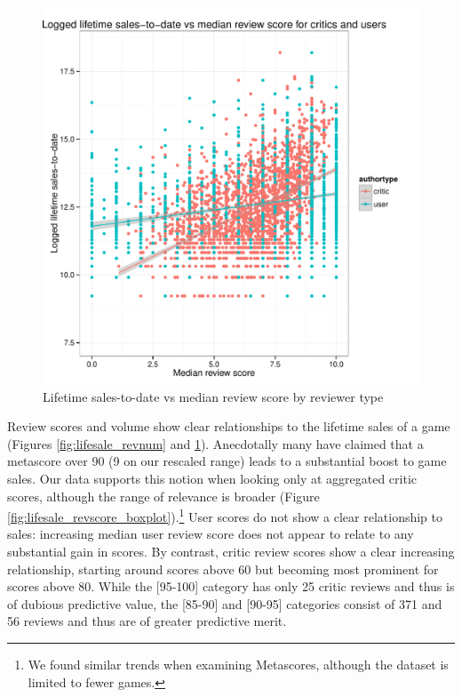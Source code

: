 \documentclass[letterpaper]{article}
\begin{document}
\begin{figure}[tbp]
\centering
\includegraphics[width=\linewidth]{./sales_medianscore_total}
\caption{Lifetime sales-to-date vs median review score by reviewer type}
\label{fig:lifesale_revscore}
\end{figure}

Review scores and volume show clear relationships to the lifetime sales of a game (Figures \ref{fig:lifesale_revnum} and \ref{fig:lifesale_revscore}). Anecdotally many have claimed that a metascore over 90 (9 on our rescaled range) leads to a substantial boost to game sales. Our data supports this notion when looking only at aggregated critic scores, although the range of relevance is broader (Figure \ref{fig:lifesale_revscore_boxplot}).\footnote{We found similar trends when examining Metascores, although the dataset is limited to fewer games.} User scores do not show a clear relationship to sales: increasing median user review score does not appear to relate to any substantial gain in scores. By contrast, critic review scores show a clear increasing relationship, starting around scores above 60 but becoming most prominent for scores above 80. While the [95-100] category has only 25 critic reviews and thus is of dubious predictive value, the [85-90] and [90-95] categories consist of 371 and 56 reviews and thus are of greater predictive merit.
\end{document}
